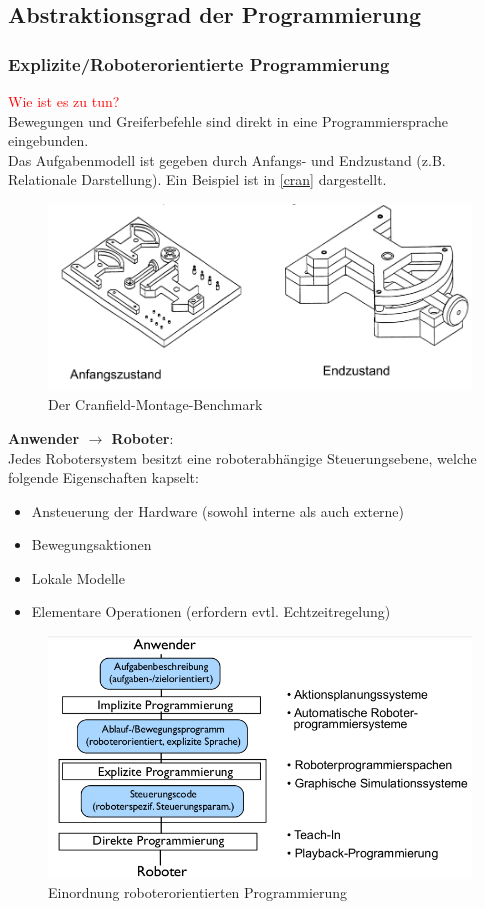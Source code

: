 \subsection{Abstraktionsgrad der Programmierung}
\subsubsection{Explizite/Roboterorientierte Programmierung}
\textcolor{red}{\glqq Wie ist es zu tun?\grqq} \\
Bewegungen und Greiferbefehle sind direkt in eine Programmiersprache eingebunden.\\
Das Aufgabenmodell ist gegeben durch Anfangs- und Endzustand (z.B. Relationale Darstellung). Ein Beispiel ist in \autoref{cran} dargestellt.
\begin{figure}[h!]\centering 
\includegraphics[width=0.7\linewidth]{figures/ch01_cranfield.png}
\caption{Der Cranfield-Montage-Benchmark}
\label{cran}
\end{figure}
\textbf{Anwender $\rightarrow$ Roboter}:\\
Jedes Robotersystem besitzt eine roboterabhängige Steuerungsebene, welche folgende Eigenschaften kapselt:
\begin{itemize}
\item Ansteuerung der Hardware (sowohl interne als auch externe)
\item Bewegungsaktionen
\item Lokale Modelle
\item Elementare Operationen (erfordern evtl. Echtzeitregelung)
\end{itemize}
\begin{figure}[h!]\centering 
\includegraphics[width=0.7\linewidth]{figures/ch01_einordnung.png}
\caption{Einordnung roboterorientierten Programmierung}
\label{cran}
\end{figure}

